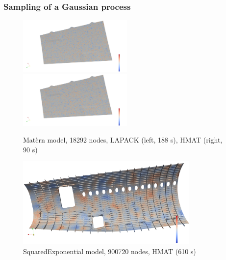 \documentclass{beamer}
\begin{document}
\begin{frame}
\frametitle{Sampling of a Gaussian process}

\begin{figure}
\begin{center}
\includegraphics[width=0.5\textwidth]{figures/medium_lapack.png}%
\includegraphics[width=0.5\textwidth]{figures/medium_hmat.png}
\end{center}
\caption{Mat\`ern model, 18292 nodes, LAPACK (left, 188 s), HMAT (right, 90 s)}
\end{figure}

\begin{figure}
\begin{center}
\includegraphics[width=0.8\textwidth]{figures/large_hmat.png}
\end{center}
\caption{SquaredExponential model, 900720 nodes, HMAT (610 s)}
\end{figure}


\end{frame}
\end{document}
